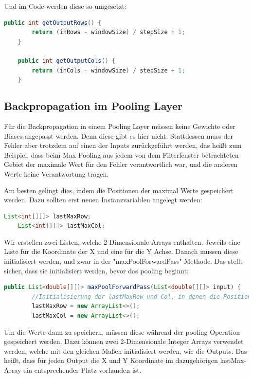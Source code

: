 \documentclass[12pt]{article}
\begin{document}
Und im Code werden diese so umgesetzt:

\begin{lstlisting}[language=Java]
    public int getOutputRows() {
        return (inRows - windowSize) / stepSize + 1;
    }

    public int getOutputCols() {
        return (inCols - windowSize) / stepSize + 1;
    }
\end{lstlisting}

\subsection{Backpropagation im Pooling Layer}
Für die Backpropagation in einem Pooling Layer müssen keine Gewichte oder Biases angepasst werden. Denn diese gibt es hier nicht. Stattdessen muss der Fehler aber trotzdem auf einen der Inputs zurückgeführt werden, das heißt zum Beispiel, dass beim Max Pooling aus jedem von dem Filterfenster betrachteten Gebiet der maximale Wert für den Fehler verantwortlich war, und die anderen Werte keine Verantwortung tragen. 


Am besten gelingt dies, indem die Positionen der maximal Werte gespeichert werden.
Dazu sollten erst neuen Instanzvariablen angelegt werden:


\begin{lstlisting}[language=Java]
    List<int[][]> lastMaxRow;
    List<int[][]> lastMaxCol; 
\end{lstlisting}

Wir erstellen zwei Listen, welche 2-Dimensionale Arrays enthalten. Jeweils eine Liste für die Koordinate der X und eine für die Y Achse.
Danach müssen diese initialisiert werden, und zwar in der "maxPoolForwardPass" Methode. Das stellt sicher, dass sie initialisiert werden, bevor das pooling beginnt:

\begin{lstlisting}[language=Java]
    public List<double[][]> maxPoolForwardPass(List<double[][]> input) {
        //Initialisierung der lastMaxRow und Col, in denen die Position der Maximalen Werte gespeichert werden
        lastMaxRow = new ArrayList<>();
        lastMaxCol = new ArrayList<>();
\end{lstlisting}

Um die Werte dann zu speichern, müssen diese während der pooling Operation gespeichert werden.
Dazu können zwei 2-Dimensionale Integer Arrays verwendet werden, welche mit den gleichen Maßen initialisiert werden, wie die Outputs. Das heißt, dass für jeden Output die X und Y Koordinate im dazugehörigen lastMax-Array ein entsprechender Platz vorhanden ist.
\end{document}
